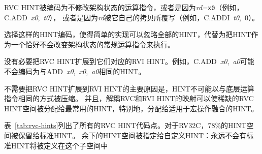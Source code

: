 RVC HINT被编码为不修改架构状态的运算指令，或者是因为{\em rd}={\tt x0}（例如，\mbox{C.ADD {\em x0}, {\em t0}}），
或者是因为{\em rd}被它自己的拷贝所覆写（例如，\mbox{C.ADDI {\em t0}, 0}）。

\begin{commentary}
选择这样的HINT编码，使得简单的实现可以忽略全部的HINT，代替为把HINT作为一个恰好不会改变架构状态的常规运算指令来执行。
\end{commentary}

没有必要把RVC HINT扩展到它们对应的RVI HINT。例如，\mbox{C.ADD {\em x0}, {\em a0}}可能不会编码为与\mbox{ADD {\em x0}, {\em x0}, {\em a0}}相同的HINT。

\begin{commentary}
不需要把RVC HINT扩展到RVI HINT的主要原因是，HINT不可能以与底层运算指令相同的方式被压缩。
并且，解耦RVC和RVI HINT的映射可以使稀缺的RVC HINT空间被分配给最常用的HINT，特别地，分配给适用于宏操作融合的HINT。
\end{commentary}

表~\ref{tab:rvc-hints}列出了所有的RVC HINT代码点。对于RV32C，78\%的HINT空间被保留给标准HINT。
余下的HINT空间被指定给自定义HINT：永远不会有标准HINT将被定义在这个子空间中

